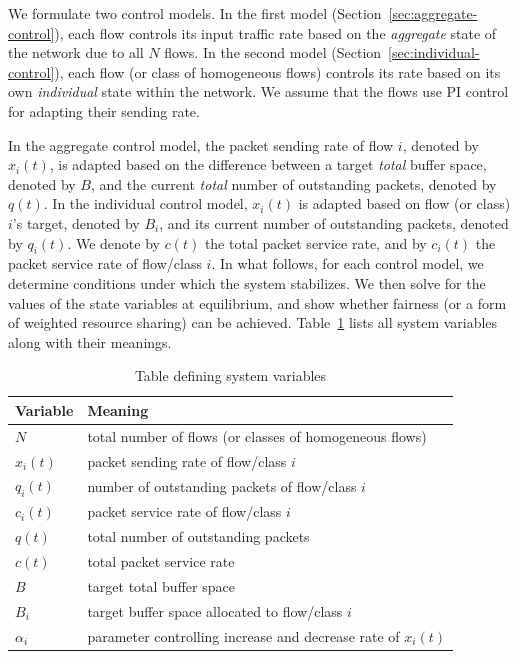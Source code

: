 \documentclass{article}
\begin{document}
We formulate 
two control models.
In the first model (Section~\ref{sec:aggregate-control}),
each flow controls its input traffic rate
based on the {\em aggregate} state of the network
due to all $N$ flows.
In the second model (Section~\ref{sec:individual-control}),
each flow  (or class of
homogeneous flows) controls its rate based
on its own {\em individual} state within the network.
We assume that the flows use PI control for adapting their sending rate.

In the aggregate control model,
the packet sending rate of flow $i$,
denoted by $x_i(t)$, is adapted based
on the difference between a target {\em total} buffer space,
denoted by $B$, 
and the current {\em total} number of outstanding packets,
denoted by $q(t)$.
In the individual control model,
$x_i(t)$ is adapted based on
flow (or class) $i$'s target, denoted by $B_i$,
and its current number of outstanding packets,
denoted by $q_i(t)$.
We denote by $c(t)$
the total packet service rate,
and by $c_i(t)$
the packet service rate of flow/class $i$.
In what follows,
for each control model,
we determine conditions under which
the system stabilizes.
We then solve for the values of the state variables
at equilibrium, and show whether fairness
(or a form of weighted resource sharing) can be achieved.
Table~\ref{tab:model} lists all system variables
along with their meanings.

{\small
\begin{table}[htbp]
\begin{center}
\caption{Table defining system variables}
\label{tab:model}
\begin{tabular}{|l|l|} \hline
Variable & Meaning \\\hline \hline
$N$ & total number of flows (or classes of
homogeneous flows) \\
$x_i(t)$  & packet sending rate of flow/class $i$  \\
$q_i(t)$  & number of outstanding packets of flow/class $i$  \\
$c_i(t)$  & packet service rate of flow/class $i$  \\
$q(t)$    & total number of outstanding packets  \\
$c(t)$    & total packet service rate \\ 
$B$      & target total buffer space \\
$B_i$    & target buffer space allocated to flow/class $i$ \\
$\alpha_i$ & parameter controlling increase and 
	decrease rate of $x_i(t)$ \\ \hline 
\end{tabular}
\end{center}
\end{table}
}
\end{document}
